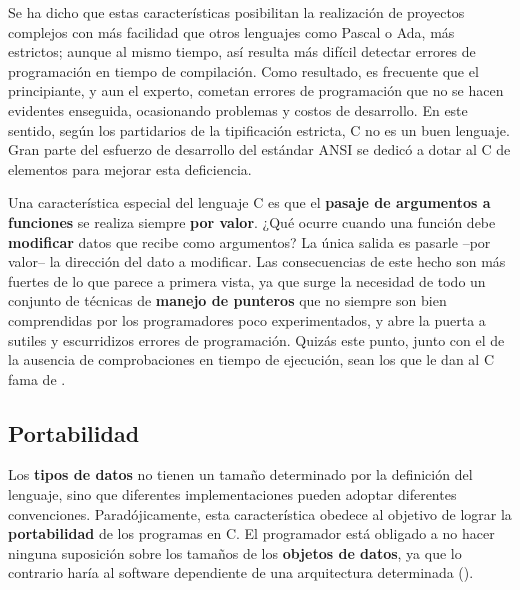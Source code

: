 Se ha dicho que estas características
 posibilitan la realización de
proyectos complejos con más facilidad que otros lenguajes como Pascal
o Ada, más estrictos; aunque al mismo tiempo, así resulta más
difícil detectar errores de programación en tiempo de
compilación. Como resultado, es frecuente que el
principiante, y aun el experto, cometan errores de programación que
no se hacen evidentes enseguida, ocasionando problemas y costos de
desarrollo. En este sentido, según los partidarios de la
tipificación estricta, C no es un buen lenguaje. Gran parte del
esfuerzo de desarrollo del estándar ANSI se dedicó a dotar al C de
elementos para mejorar esta deficiencia. 

Una característica especial del lenguaje C es que el \textbf{pasaje de
argumentos a funciones} se realiza siempre \textbf{por valor}. ¿Qué ocurre
cuando una función debe \textbf{modificar} datos que recibe como
argumentos? La única salida es pasarle --por valor-- la dirección del
dato a modificar. Las consecuencias de este hecho son más fuertes de
lo que parece a primera vista, ya que surge la necesidad de todo un
conjunto de técnicas de \textbf{manejo de punteros} que no siempre son bien
comprendidas por los programadores poco experimentados, y abre la
puerta a sutiles y escurridizos errores de programación. Quizás
este punto, junto con el de la ausencia de comprobaciones en tiempo de
ejecución, sean los que le dan al C fama de . 

\subsection{Portabilidad}
Los \textbf{tipos de datos} no tienen un tamaño determinado por la definición
del lenguaje, sino que diferentes implementaciones pueden adoptar
diferentes convenciones. Paradójicamente, esta característica
obedece al objetivo de lograr la \textbf{portabilidad} de los programas en C. El
programador está obligado a no hacer ninguna suposición sobre los
tamaños de los \textbf{objetos de datos}, ya que lo contrario haría al
software dependiente de una arquitectura determinada (). 



